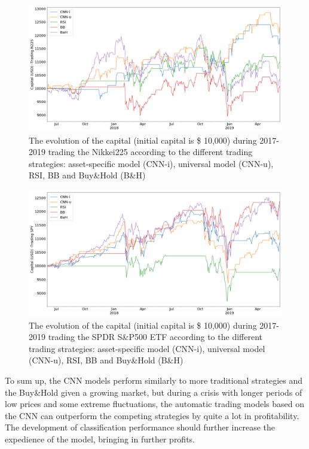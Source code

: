 \documentclass[11pt, a4paper]{article}
\begin{document}
\begin{figure}[H]
    \centering
    \includegraphics[width=.99\textwidth]{images/capitals/Capitals3_N225.png}
    \caption{The evolution of the capital (initial capital is \$ 10,000) during 2017-2019 trading the Nikkei225 according to the different trading strategies: asset-specific model (CNN-i), universal model (CNN-u), RSI, BB and Buy\&Hold (B\&H)}
    \label{fig:P3_N225capevol}
\end{figure}
\begin{figure}[H]
    \centering
    \includegraphics[width=.99\textwidth]{images/capitals/Capitals3_SPY.png}
    \caption{The evolution of the capital (initial capital is \$ 10,000) during 2017-2019 trading the SPDR S\&P500 ETF according to the different trading strategies: asset-specific model (CNN-i), universal model (CNN-u), RSI, BB and Buy\&Hold (B\&H)}
    \label{fig:P3_SPYcapevol}
\end{figure}
To sum up, the CNN models perform similarly to more traditional strategies and the Buy\&Hold given a growing market, but during a crisis with longer periods of low prices and some extreme fluctuations, the automatic trading models based on the CNN can outperform the competing strategies by quite a lot in profitability. The development of classification performance should further increase the expedience of the model, bringing in further profits. 
\end{document}
